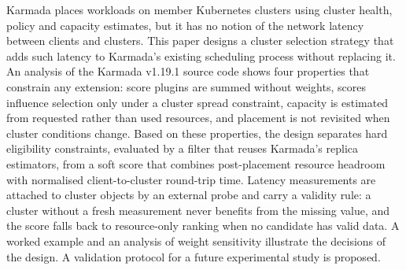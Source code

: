 \begin{csmdabstract}
Karmada places workloads on member Kubernetes clusters using cluster health, policy and capacity estimates, but it has no notion of the network latency between clients and clusters. This paper designs a cluster selection strategy that adds such latency to Karmada's existing scheduling process without replacing it. An analysis of the Karmada v1.19.1 source code shows four properties that constrain any extension: score plugins are summed without weights, scores influence selection only under a cluster spread constraint, capacity is estimated from requested rather than used resources, and placement is not revisited when cluster conditions change. Based on these properties, the design separates hard eligibility constraints, evaluated by a filter that reuses Karmada's replica estimators, from a soft score that combines post-placement resource headroom with normalised client-to-cluster round-trip time. Latency measurements are attached to cluster objects by an external probe and carry a validity rule: a cluster without a fresh measurement never benefits from the missing value, and the score falls back to resource-only ranking when no candidate has valid data. A worked example and an analysis of weight sensitivity illustrate the decisions of the design. A validation protocol for a future experimental study is proposed.
\end{csmdabstract}

